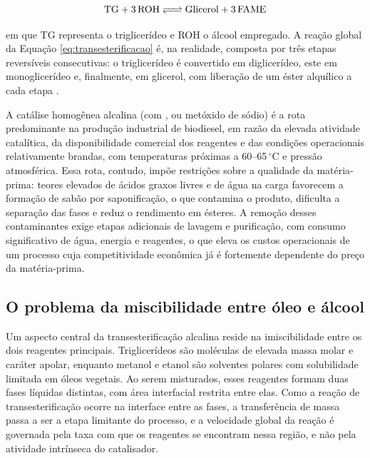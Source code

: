 \begin{equation}
    \ce{TG + 3 ROH <=> Glicerol + 3 FAME}
    \label{eq:transesterificacao}
\end{equation}

\noindent em que TG representa o triglicerídeo e ROH o álcool empregado.
A reação global da Equação \ref{eq:transesterificacao} é, na realidade, composta por três etapas reversíveis consecutivas: o triglicerídeo é convertido em diglicerídeo, este em monoglicerídeo e, finalmente, em glicerol, com liberação de um éster alquílico a cada etapa \cite{roosta2016}.

A catálise homogênea alcalina (com ,  ou metóxido de
sódio) é a rota predominante na produção industrial de biodiesel, em razão da elevada atividade catalítica, da disponibilidade comercial dos reagentes e das condições operacionais relativamente brandas, com temperaturas próximas a 60--65\,$^{\circ}$C e pressão atmosférica\cite{dabdoub2009,leung2010}. Essa rota, contudo, impõe restrições sobre a qualidade da matéria-prima: teores elevados de ácidos graxos livres e de água na carga favorecem a formação de sabão por saponificação, o que contamina o produto, dificulta a separação das fases e reduz o rendimento em ésteres\cite{verma2016}. A remoção desses contaminantes exige etapas adicionais de lavagem e purificação, com consumo significativo de água, energia e reagentes, o que eleva os custos operacionais de um processo cuja competitividade econômica já é fortemente dependente do preço da matéria-prima\cite{dabdoub2009}.

\subsection{O problema da miscibilidade entre óleo e álcool}

Um aspecto central da transesterificação alcalina reside na imiscibilidade entre os dois reagentes principais. Triglicerídeos são moléculas de elevada massa molar e caráter apolar, enquanto metanol e etanol são solventes polares com solubilidade limitada em óleos vegetais. Ao serem misturados, esses reagentes formam duas fases líquidas distintas, com área interfacial restrita entre elas\cite{roosta2016}. Como a reação de transesterificação ocorre na interface entre as fases, a transferência de massa passa a ser a etapa limitante do processo, e a velocidade global da reação é governada pela taxa com que os reagentes se encontram nessa região, e não pela atividade intrínseca do catalisador\cite{roosta2016}.

